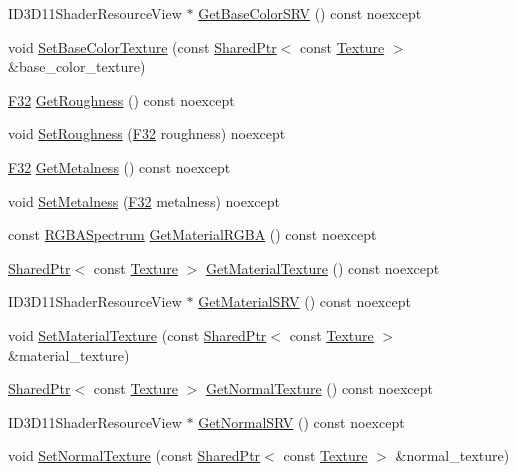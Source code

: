 \begin{DoxyCompactItemize}
\item 
I\+D3\+D11\+Shader\+Resource\+View $\ast$ \hyperlink{structmage_1_1_material_aef6ae5f87347d9e4bf798079aa906dd3}{Get\+Base\+Color\+S\+RV} () const noexcept
\item 
void \hyperlink{structmage_1_1_material_add87c1ebf7783980ac21e986c080505b}{Set\+Base\+Color\+Texture} (const \hyperlink{namespacemage_a1e01ae66713838a7a67d30e44c67703e}{Shared\+Ptr}$<$ const \hyperlink{classmage_1_1_texture}{Texture} $>$ \&base\+\_\+color\+\_\+texture)
\item 
\hyperlink{namespacemage_aa97e833b45f06d60a0a9c4fc22ae02c0}{F32} \hyperlink{structmage_1_1_material_a5b1a4e965f812e18594cf7455d49139c}{Get\+Roughness} () const noexcept
\item 
void \hyperlink{structmage_1_1_material_ad1df4026da1b5abc3924c7ce09a81a02}{Set\+Roughness} (\hyperlink{namespacemage_aa97e833b45f06d60a0a9c4fc22ae02c0}{F32} roughness) noexcept
\item 
\hyperlink{namespacemage_aa97e833b45f06d60a0a9c4fc22ae02c0}{F32} \hyperlink{structmage_1_1_material_a9d91ff9ce999d24558305f070d0cde93}{Get\+Metalness} () const noexcept
\item 
void \hyperlink{structmage_1_1_material_a70dde310b2108e9ad3041df13db0bdc0}{Set\+Metalness} (\hyperlink{namespacemage_aa97e833b45f06d60a0a9c4fc22ae02c0}{F32} metalness) noexcept
\item 
const \hyperlink{structmage_1_1_r_g_b_a_spectrum}{R\+G\+B\+A\+Spectrum} \hyperlink{structmage_1_1_material_a079997ddbe4a482f1d802bc537329318}{Get\+Material\+R\+G\+BA} () const noexcept
\item 
\hyperlink{namespacemage_a1e01ae66713838a7a67d30e44c67703e}{Shared\+Ptr}$<$ const \hyperlink{classmage_1_1_texture}{Texture} $>$ \hyperlink{structmage_1_1_material_aa8accf832423420f6b2ed4b50ef394b3}{Get\+Material\+Texture} () const noexcept
\item 
I\+D3\+D11\+Shader\+Resource\+View $\ast$ \hyperlink{structmage_1_1_material_a0675c4bbbdb48c0db9bf82fffb073094}{Get\+Material\+S\+RV} () const noexcept
\item 
void \hyperlink{structmage_1_1_material_a8f88eda4c45268bf6a30878948055ff5}{Set\+Material\+Texture} (const \hyperlink{namespacemage_a1e01ae66713838a7a67d30e44c67703e}{Shared\+Ptr}$<$ const \hyperlink{classmage_1_1_texture}{Texture} $>$ \&material\+\_\+texture)
\item 
\hyperlink{namespacemage_a1e01ae66713838a7a67d30e44c67703e}{Shared\+Ptr}$<$ const \hyperlink{classmage_1_1_texture}{Texture} $>$ \hyperlink{structmage_1_1_material_a41a286cf05a2627ee0baef602b01a1fb}{Get\+Normal\+Texture} () const noexcept
\item 
I\+D3\+D11\+Shader\+Resource\+View $\ast$ \hyperlink{structmage_1_1_material_a0be98911c56dedaa4fd2f8714fc8a793}{Get\+Normal\+S\+RV} () const noexcept
\item 
void \hyperlink{structmage_1_1_material_a178b5b945137d7aab35db01a2e52ab31}{Set\+Normal\+Texture} (const \hyperlink{namespacemage_a1e01ae66713838a7a67d30e44c67703e}{Shared\+Ptr}$<$ const \hyperlink{classmage_1_1_texture}{Texture} $>$ \&normal\+\_\+texture)
\end{DoxyCompactItemize}

